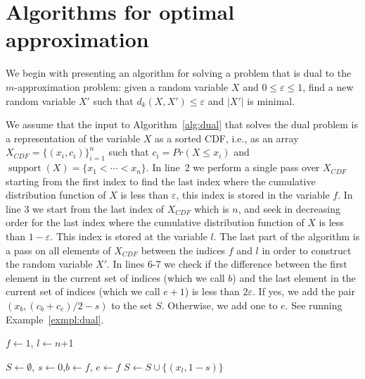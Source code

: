 \documentclass[letterpaper]{article} %
\DeclareMathOperator{\supp}{support}
\begin{document}
\section{Algorithms for optimal approximation}\label{sec:algEfficient}
We begin with presenting an algorithm for solving a problem that is dual to the $m$-approximation problem: given a random variable $X$ and $0 \leq \varepsilon \leq 1$, find a new random variable $X'$ such that $d_k(X,X')\leq \varepsilon$ and $|X'|$ is minimal. 

We assume that the input to Algorithm~\ref{alg:dual} that solves the dual problem is a representation of the variable $X$ as a sorted CDF, i.e.,  as an array $X_{CDF}=\{(x_i, c_i)\}_{i=1}^n$ such that $c_i = Pr(X \leq x_i)$ and $\supp(X)=\{x_1 <\cdots < x_n\}$. In line~2 we perform a single pass over $X_{CDF}$ starting from the first index to find the last index where the cumulative distribution function of $X$ is less than $\varepsilon$, this index is stored in the variable $f$. In line 3 we start from the last index of $X_{CDF}$ which is $n$, and seek in decreasing order for the last index where the cumulative distribution function of $X$ is less than $1-\varepsilon$. This index is stored at the variable $l$. The last part of the algorithm is a pass on all elements of $X_{CDF}$ between the indices $f$ and $l$ in order to construct the random variable $X'$. In lines 6-7 we check if the difference between the first element in the current set of indices (which we call $b$) and the last element in the current set of indices (which we call $e+1$) is less than $2\varepsilon$. If yes, we add the pair $(x_{b}, (c_b+c_e)/2 - s)$ to the set $S$. Otherwise, we add one to $e$. See running Example~\ref{exmpl:dual}.

\begin{algorithm}
	\DontPrintSemicolon
    $f \gets 1$, $l \gets n$+1\; 


	$S \gets \emptyset$, $s \gets 0$,$b \gets f$, $e \gets f$\;
	$S \gets S \cup \{(x_{l}, 1 - s) \}$\;
    	
    	
	
	\caption{$dual(\{(x_i, c_i)\}_{i=1}^n,\varepsilon)$  }   
	\label{alg:dual}
\end{algorithm}
\end{document}
